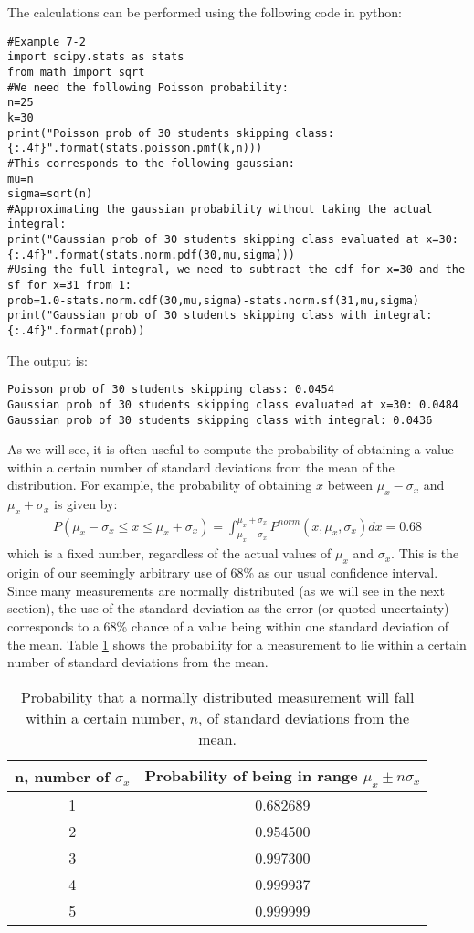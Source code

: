 \begin{example}{}
The calculations can be performed using the following code in python:
\begin{lstlisting}
#Example 7-2
import scipy.stats as stats
from math import sqrt
#We need the following Poisson probability:
n=25
k=30
print("Poisson prob of 30 students skipping class: {:.4f}".format(stats.poisson.pmf(k,n)))
#This corresponds to the following gaussian:
mu=n
sigma=sqrt(n)
#Approximating the gaussian probability without taking the actual integral:
print("Gaussian prob of 30 students skipping class evaluated at x=30: {:.4f}".format(stats.norm.pdf(30,mu,sigma)))
#Using the full integral, we need to subtract the cdf for x=30 and the sf for x=31 from 1:
prob=1.0-stats.norm.cdf(30,mu,sigma)-stats.norm.sf(31,mu,sigma)
print("Gaussian prob of 30 students skipping class with integral: {:.4f}".format(prob))
\end{lstlisting}
The output is:
\begin{verbatim}
Poisson prob of 30 students skipping class: 0.0454
Gaussian prob of 30 students skipping class evaluated at x=30: 0.0484
Gaussian prob of 30 students skipping class with integral: 0.0436
\end{verbatim}

\end{example}

As we will see, it is often useful to compute the probability of obtaining a value within a certain number of standard deviations from the mean of the distribution. For example, the probability of obtaining $x$ between $\mu_x-\sigma_x$ and $\mu_x+\sigma_x$ is given by:
 \begin{align}
P(\mu_x-\sigma_x \leq x \leq \mu_x+\sigma_x) = \int_{\mu_x-\sigma_x}^{\mu_x+\sigma_x}P^{norm}(x,\mu_x,\sigma_x)dx=0.68
\end{align}
which is a fixed number, regardless of the actual values of $\mu_x$ and $\sigma_x$. This is the origin of our seemingly arbitrary use of 68\% as our usual confidence interval. Since many measurements are normally distributed (as we will see in the next section), the use of the standard deviation as the error (or quoted uncertainty) corresponds to a 68\% chance of a value being within one standard deviation of the mean. Table \ref{tab:normsigma} shows the probability for a measurement to lie within a certain number of standard deviations from the mean.
\begin{table}[h!]
\center
\begin{tabular}{|c|c|}
\hline
\textbf{n, number of $\sigma_x$} & \textbf{Probability of being in range $\mu_x\pm n\sigma_x$}\\
\hline
1 & 0.682689\\
2 & 0.954500\\
3 & 0.997300\\
4 & 0.999937\\
5 & 0.999999\\
\hline
\end{tabular}
\caption{\label{tab:normsigma}Probability that a normally distributed measurement will fall within a certain number, $n$, of standard deviations from the mean.}
\end{table}

